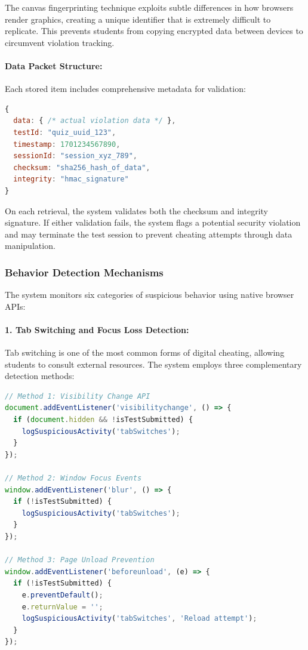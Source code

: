 The canvas fingerprinting technique exploits subtle differences in how browsers render graphics, creating a unique identifier that is extremely difficult to replicate. This prevents students from copying encrypted data between devices to circumvent violation tracking.

\paragraph{Data Packet Structure:}
Each stored item includes comprehensive metadata for validation:

\begin{lstlisting}[language=JavaScript, caption={Structure of Encrypted Data Packet}]
{
  data: { /* actual violation data */ },
  testId: "quiz_uuid_123",
  timestamp: 1701234567890,
  sessionId: "session_xyz_789",
  checksum: "sha256_hash_of_data",
  integrity: "hmac_signature"
}
\end{lstlisting}

On each retrieval, the system validates both the checksum and integrity signature. If either validation fails, the system flags a potential security violation and may terminate the test session to prevent cheating attempts through data manipulation.

\subsubsection{Behavior Detection Mechanisms}

The system monitors six categories of suspicious behavior using native browser APIs:

\paragraph{1. Tab Switching and Focus Loss Detection:}
Tab switching is one of the most common forms of digital cheating, allowing students to consult external resources. The system employs three complementary detection methods:

\begin{lstlisting}[language=JavaScript, caption={Multi-Method Tab Switch Detection}]
// Method 1: Visibility Change API
document.addEventListener('visibilitychange', () => {
  if (document.hidden && !isTestSubmitted) {
    logSuspiciousActivity('tabSwitches');
  }
});

// Method 2: Window Focus Events
window.addEventListener('blur', () => {
  if (!isTestSubmitted) {
    logSuspiciousActivity('tabSwitches');
  }
});

// Method 3: Page Unload Prevention
window.addEventListener('beforeunload', (e) => {
  if (!isTestSubmitted) {
    e.preventDefault();
    e.returnValue = '';
    logSuspiciousActivity('tabSwitches', 'Reload attempt');
  }
});
\end{lstlisting}

